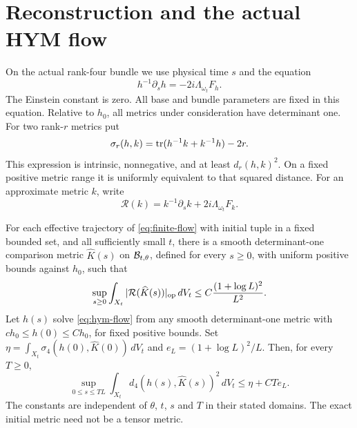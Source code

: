 \section{Reconstruction and the actual HYM flow}\label{sec:actual-flow}

On the actual rank-four bundle we use physical time $s$ and the equation
\begin{equation}\label{eq:hym-flow}
 h^{-1}\partial_sh=-2i\Lambda_{\omega_t}F_h.
\end{equation}
The Einstein constant is zero. All base and bundle parameters are fixed
in this equation. Relative to $h_0$, all metrics under consideration
have determinant one. For two rank-$r$ metrics put
\begin{equation}\label{eq:trace-distance}
 \sigma_r(h,k)=\operatorname{tr}(h^{-1}k+k^{-1}h)-2r.
\end{equation}
This expression is intrinsic, nonnegative, and at least $d_r(h,k)^2$.
On a fixed positive metric range it is uniformly equivalent to that
squared distance. For an approximate metric $k$, write
\[
 \mathcal R(k)=k^{-1}\partial_sk+2i\Lambda_{\omega_t}F_k.
\]

\begin{theorem}\label{thm:actual-tracking}
For each effective trajectory of \eqref{eq:finite-flow} with initial tuple
in a fixed bounded set, and all sufficiently small $t$, there is a smooth
determinant-one comparison metric $\widehat K(s)$ on $\mathcal B_{t,\theta}$,
defined for every $s\ge0$, with uniform positive bounds against $h_0$,
such that
\begin{equation}\label{eq:global-residual}
 \sup_{s\ge0}\int_{X_t}|\mathcal R(\widehat K(s))|_{\mathrm{op}}\,dV_t
        \le C\frac{(1+\log L)^2}{L^2}.
\end{equation}
Let $h(s)$ solve \eqref{eq:hym-flow} from any smooth determinant-one
metric with $ch_0\le h(0)\le Ch_0$, for fixed positive bounds.
Set $\eta=\int_{X_t}\sigma_4(h(0),\widehat K(0))\,dV_t$ and
$e_L=(1+\log L)^2/L$. Then, for every $T\ge0$,
\begin{equation}\label{eq:bounded-tracking}
 \sup_{0\le s\le TL}\int_{X_t}d_4(h(s),\widehat K(s))^2\,dV_t
          \le\eta+CTe_L.
\end{equation}
The constants are independent of $\theta$, $t$, $s$ and $T$ in their
stated domains. The exact initial metric need not be a tensor metric.
\end{theorem}

